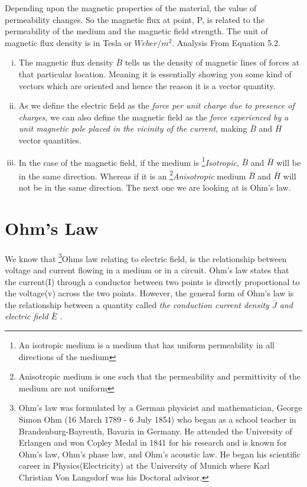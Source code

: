 Depending upon the magnetic properties of the material, the value of permeability changes. So the magnetic flux at point, P, is related to the permeability of the medium and the magnetic field strength. The unit of magnetic flux density is in Tesla or $Weber/m^{2}$. Analysis From Equation 5.2.
\begin{enumerate}[(i)]
\item The magnetic flux density $\bar{B}$ tells us the density of magnetic lines of forces at that particular location. Meaning it is essentially showing you some kind of vectors which are oriented and hence the reason it is a vector quantity.
\item As we define the electric field as the \emph{force per unit charge due to presence of charges}, we can also define the magnetic field as the \emph{force experienced by a unit magnetic pole placed in the vicinity of the current}, making $\bar{B}$ and $\bar{H}$ vector quantities.
\item In the case of the magnetic field, if the medium is \footnote[2]{An isotropic medium is a medium that has uniform permeability in all directions of the medium }\emph{Isotropic}, $\bar{B}$ and $\bar{H}$ will be in the same direction. Whereas if it is an \footnote[3]{Anisotropic medium is one such that the permeability and permittivity of the medium are not uniform }\emph{Anisotropic} medium $\bar{B}$ and $\bar{H}$ will not be in the same direction. The next one we are looking at is Ohm's law.
\end{enumerate}

\section{Ohm's Law} 
We know that \footnote[4]{
Ohm's law was formulated by a German physicist and mathematician, George Simon Ohm (16 March 1789 - 6 July 1854) who began as a school teacher in Brandenburg-Bayreuth, Bavaria in Germany. He attended the University of Erlangen and won Copley Medal in 1841 for his research and is known for Ohm's law, Ohm's phase law, and Ohm's acoustic law. He began his scientific career in Physics(Electricity) at the University of Munich where Karl Christian Von Langsdorf was his Doctoral advisor.}Ohms law relating to electric field, is the relationship between voltage and current flowing in a medium or in a circuit. Ohm's law states that the current(I) through a conductor between two points is directly proportional to the voltage(v) across the two points. However, the general form of Ohm's law is the relationship between a quantity called \emph{the conduction current density $ \bar{J} $ and electric field $ \bar{E} $
}.


